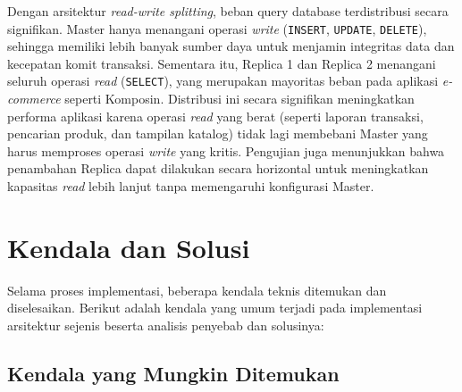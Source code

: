 Dengan arsitektur \textit{read-write splitting}, beban query database
terdistribusi secara signifikan. Master hanya menangani operasi
\textit{write} (\texttt{INSERT}, \texttt{UPDATE}, \texttt{DELETE}),
sehingga memiliki lebih banyak sumber daya untuk menjamin integritas
data dan kecepatan komit transaksi. Sementara itu, Replica 1 dan
Replica 2 menangani seluruh operasi \textit{read} (\texttt{SELECT}),
yang merupakan mayoritas beban pada aplikasi \textit{e-commerce}
seperti Komposin. Distribusi ini secara signifikan meningkatkan
performa aplikasi karena operasi \textit{read} yang berat (seperti
laporan transaksi, pencarian produk, dan tampilan katalog) tidak lagi
membebani Master yang harus memproses operasi \textit{write} yang
kritis. Pengujian juga menunjukkan bahwa penambahan Replica dapat
dilakukan secara horizontal untuk meningkatkan kapasitas \textit{read}
lebih lanjut tanpa memengaruhi konfigurasi Master.

\section{Kendala dan Solusi}

Selama proses implementasi, beberapa kendala teknis ditemukan dan
diselesaikan. Berikut adalah kendala yang umum terjadi pada
implementasi arsitektur sejenis beserta analisis penyebab dan
solusinya:

\subsection{Kendala yang Mungkin Ditemukan}

